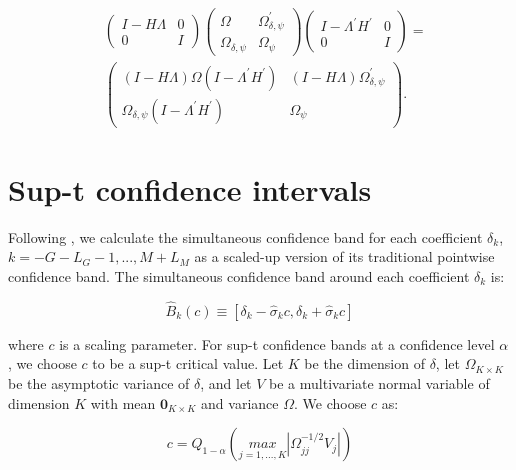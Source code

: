 \documentclass[12pt]{article}
\begin{document}
\begin{align*}
&
\begin{pmatrix}I-H\Lambda & 0\\
0 & I
\end{pmatrix}\begin{pmatrix}\Omega & \Omega_{\delta,\psi}^{\prime}\\
\Omega_{\delta,\psi} & \Omega_{\psi}
\end{pmatrix}\begin{pmatrix}I-\Lambda^{\prime}H^{\prime} & 0\\
0 & I
\end{pmatrix}=\\
&\begin{pmatrix}(I-H\Lambda)\Omega(I-\Lambda^{\prime}H^{\prime}) & (I-H\Lambda)\Omega_{\delta,\psi}^{\prime}\\
\Omega_{\delta,\psi}(I-\Lambda^{\prime}H^{\prime}) & \Omega_{\psi}
\end{pmatrix}.
\end{align*}

\section{Sup-t confidence intervals}
\label{sec:sup-t}

Following \cite{montiel2019simultaneous}, we calculate the simultaneous confidence band for each coefficient $\delta_k$, $k=-G-L_G-1,...,M+L_M$ as a scaled-up version of its traditional pointwise confidence band.
The simultaneous confidence band around each coefficient $\delta_k$ is:

\begin{equation*}
\hat{B}_k (c) \equiv \left[ \delta_k - \hat{\sigma}_k c, \delta_k + \hat{\sigma}_k c \right ]
\end{equation*}

where $c$ is a scaling parameter. For sup-t confidence bands at a confidence level $\alpha$, we choose $c$ to be a sup-t critical value. Let $K$ be the dimension of $\delta$, let  $\Omega_{K \times K}$ be the asymptotic variance of $\delta$, and let $V$ be a multivariate normal variable of dimension $K$ with mean $\mathbf{0}_{K \times K}$ and variance $\Omega$.
We choose $c$ as:

\begin{equation*}
  c = Q_{1-\alpha} \left( \underset{j=1,...,K}{max} \left| \Omega_{jj}^{-1/2} V_j \right| \right)
\end{equation*}
\end{document}
